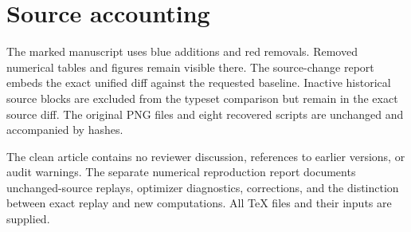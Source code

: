 \documentclass[11pt,a4paper]{article}
\begin{document}
\section*{Source accounting}
The marked manuscript uses blue additions and red removals. Removed numerical tables and figures remain visible there. The source-change report embeds the exact unified diff against the requested baseline. Inactive historical source blocks are excluded from the typeset comparison but remain in the exact source diff. The original PNG files and eight recovered scripts are unchanged and accompanied by hashes.

The clean article contains no reviewer discussion, references to earlier versions, or audit warnings. The separate numerical reproduction report documents unchanged-source replays, optimizer diagnostics, corrections, and the distinction between exact replay and new computations. All TeX files and their inputs are supplied.
\end{document}
